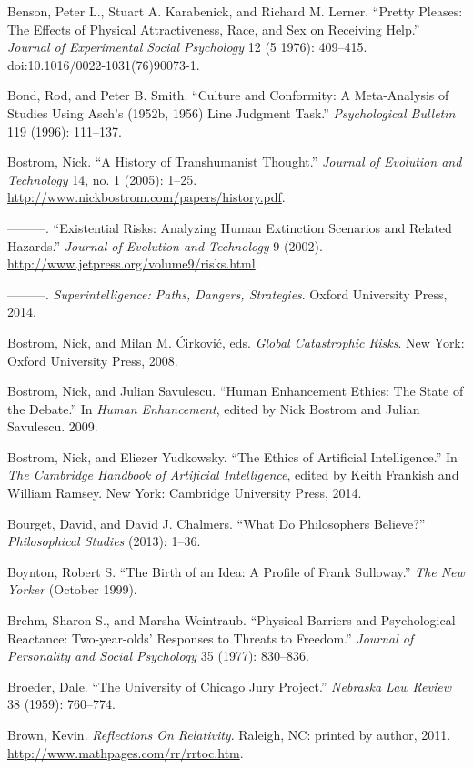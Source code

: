 {
 Benson, Peter L., Stuart A. Karabenick, and Richard M. Lerner.
``Pretty Pleases: The Effects of Physical
Attractiveness, Race, and Sex on Receiving Help.''
\textit{Journal of Experimental Social Psychology} 12 (5 1976):
409--415. doi:10.1016/0022-1031(76)90073-1.}

{
 Bond, Rod, and Peter B. Smith. ``Culture and
Conformity: A Meta-Analysis of Studies Using Asch's
(1952b, 1956) Line Judgment Task.''
\textit{Psychological Bulletin} 119 (1996): 111--137.}

{
 Bostrom, Nick. ``A History of Transhumanist
Thought.'' \textit{Journal of Evolution and
Technology} 14, no. 1 (2005): 1--25.
\url{http://www.nickbostrom.com/papers/history.pdf}.}

{
 {}---{}---{}---. ``Existential Risks: Analyzing
Human Extinction Scenarios and Related Hazards.''
\textit{Journal of Evolution and Technology} 9 (2002).
\url{http://www.jetpress.org/volume9/risks.html}.}

{
 {}---{}---{}---. \textit{Superintelligence: Paths, Dangers,
Strategies}. Oxford University Press, 2014.}

{
 Bostrom, Nick, and Milan M. \'Cirkovi\'c, eds. \textit{Global
Catastrophic Risks}. New York: Oxford University Press, 2008.}

{
 Bostrom, Nick, and Julian Savulescu. ``Human
Enhancement Ethics: The State of the Debate.'' In
\textit{Human Enhancement}, edited by Nick Bostrom and Julian
Savulescu. 2009.}

{
 Bostrom, Nick, and Eliezer Yudkowsky. ``The
Ethics of Artificial Intelligence.'' In \textit{The
Cambridge Handbook of Artificial Intelligence}, edited by Keith
Frankish and William Ramsey. New York: Cambridge University Press,
2014.}

{
 Bourget, David, and David J. Chalmers. ``What Do
Philosophers Believe?'' \textit{Philosophical
Studies} (2013): 1--36.}

{
 Boynton, Robert S. ``The Birth of an Idea: A
Profile of Frank Sulloway.'' \textit{The New Yorker}
(October 1999).}

{
 Brehm, Sharon S., and Marsha Weintraub.
``Physical Barriers and Psychological Reactance:
Two-year-olds' Responses to Threats to
Freedom.'' \textit{Journal of Personality and Social
Psychology} 35 (1977): 830--836.}

{
 Broeder, Dale. ``The University of Chicago Jury
Project.'' \textit{Nebraska Law Review} 38 (1959):
760--774.}

{
 Brown, Kevin. \textit{Reflections On Relativity}. Raleigh, NC:
printed by author, 2011. \url{http://www.mathpages.com/rr/rrtoc.htm}.}

